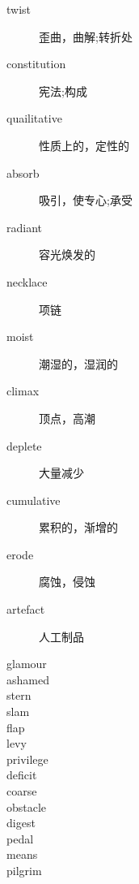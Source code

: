 \documentclass[a4paper, 10pt]{ctexart}
\begin{document}
\begin{multicols*}{2}
\begin{description}
\item[twist] 歪曲，曲解;转折处

\item[constitution] 宪法;构成

\item[quailitative] 性质上的，定性的

\item[absorb] 吸引，使专心;承受

\item[radiant] 容光焕发的

\item[necklace] 项链

\item[moist] 潮湿的，湿润的

\item[climax] 顶点，高潮

\item[deplete] 大量减少

\item[cumulative] 累积的，渐增的

\item[erode] 腐蚀，侵蚀

\item[artefact] 人工制品

\item[glamour] 

\item[ashamed] 

\item[stern] 

\item[slam] 

\item[flap] 

\item[levy] 

\item[privilege] 

\item[deficit] 

\item[coarse] 

\item[obstacle] 

\item[digest] 

\item[pedal] 

\item[means] 

\item[pilgrim] 


\end{description}
\end{multicols*}
\end{document}
